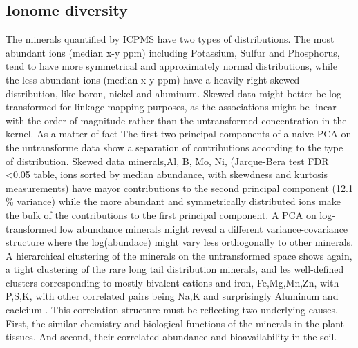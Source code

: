 \subsection{Ionome diversity}
The minerals quantified by ICPMS have two types of distributions. The most abundant ions (median x-y ppm) including Potassium, Sulfur and Phosphorus, tend to have more symmetrical and approximately normal distributions, while the less abundant ions (median x-y ppm) have a  heavily right-skewed distribution, like boron, nickel and aluminum.
Skewed data might better be log-transformed for linkage mapping purposes, as the associations might be linear with the order of magnitude rather than the untransformed concentration in the kernel. As a matter of fact The first two principal components of a naive PCA on the untransforme data show a separation of contributions according to the type of distribution.
Skewed data minerals,Al, B, Mo, Ni, (Jarque-Bera test FDR <0.05 table, ions sorted by median abundance, with skewdness and kurtosis measurements) have mayor contributions to the second principal component (12.1 \% variance) while the more abundant and symmetrically distributed ions make the bulk of the contributions to the first principal component.
A PCA on log-transformed low abundance minerals might reveal a different variance-covariance structure where the log(abundace) might vary less orthogonally to other minerals. A hierarchical clustering of the minerals on the untransformed space shows again, a tight clustering of the rare long tail distribution minerals, and les well-defined clusters corresponding to mostly bivalent cations and iron, Fe,Mg,Mn,Zn, with P,S,K, with other correlated pairs being Na,K and surprisingly Aluminum and  caclcium . This correlation structure must be reflecting two underlying causes.
First, the similar chemistry and biological functions of the minerals in the plant tissues. And second, their correlated abundance and bioavailability in the soil.
\clearpage
